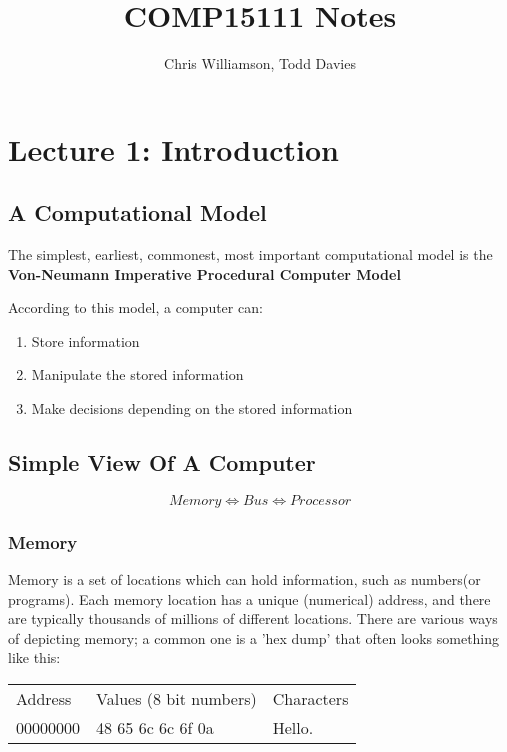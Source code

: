 \documentclass{article} %
\begin{document}
\author{Chris Williamson, Todd Davies}
\title{COMP15111 Notes}

\maketitle
\tableofcontents
\newpage

\section{Lecture 1: Introduction}
\subsection{A Computational Model}
The simplest, earliest, commonest, most important computational model is the \textbf{Von-Neumann Imperative Procedural Computer Model}

According to this model, a computer can:
\begin{enumerate}
	\item Store information
	\item Manipulate the stored information
	\item Make decisions depending on the stored information
\end{enumerate}

\subsection{Simple View Of A Computer}
\[
	Memory \Leftrightarrow Bus \Leftrightarrow Processor
\]

\subsubsection{Memory}
Memory is a set of locations which can hold information, such as numbers(or programs). Each memory location has a unique (numerical) address, and there are typically thousands of millions of different locations. There are various ways of depicting memory; a common one is a 'hex dump' that often looks something like this: 

\begin{tabular}{l l l}
	Address     &	Values (8 bit numbers)	&	Characters\\
	00000000	&	48 65 6c 6c 6f 0a		&	Hello.\\
\end{tabular}
\end{document}
